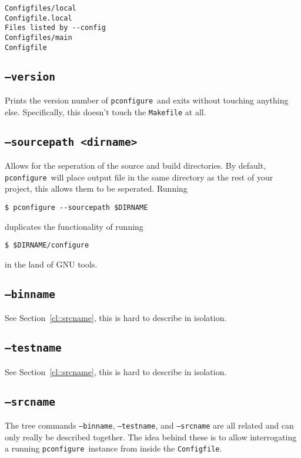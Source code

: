\documentclass{article}
\newcommand{\pconfigure}{\texttt{pconfigure}}
\begin{document}
\begin{verbatim}
Configfiles/local
Configfile.local
Files listed by --config
Configfiles/main
Configfile
\end{verbatim}

\subsection{\texttt{--version}}

Prints the version number of \pconfigure\ and exits without touching
anything else.  Specifically, this doesn't touch the \texttt{Makefile}
at all.

\subsection{\texttt{--sourcepath <dirname>}}

Allows for the seperation of the source and build directories.  By
default, \pconfigure\ will place output file in the same directory as
the rest of your project, this allows them to be seperated.  Running
\begin{verbatim}
$ pconfigure --sourcepath $DIRNAME
\end{verbatim}
duplicates the functionality of running
\begin{verbatim}
$ $DIRNAME/configure
\end{verbatim}
in the land of GNU tools.

\subsection{\texttt{--binname}}

See Section~\ref{cl::srcname}, this is hard to describe in isolation.

\subsection{\texttt{--testname}}

See Section~\ref{cl::srcname}, this is hard to describe in isolation.

\subsection{\texttt{--srcname} \label{cl::srcname}}

The tree commands \texttt{--binname}, \texttt{--testname}, and
\texttt{--srcname} are all related and can only really be described
together.  The idea behind these is to allow interrogating a running
\pconfigure\ instance from inside the \texttt{Configfile}.
\end{document}
